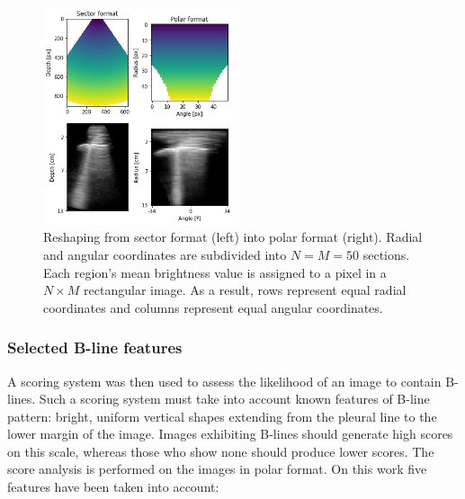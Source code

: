 \documentclass[12pt]{article} %
\begin{document}
	
	\begin{figure}
	\centering
	\includegraphics[width=0.5\textwidth]{figuras/sector_polar.png}
	\caption{\small Reshaping from sector format (left) into polar format (right). Radial and angular coordinates are subdivided into $N=M=50$ sections. Each region's mean brightness value is assigned to a pixel in a $N\times M$ rectangular image. As a result, rows represent equal radial coordinates and columns represent equal angular coordinates.}
	\label{polar}
	\end{figure}	
	
	
\subsubsection{Selected B-line features}

	A scoring system was then used to assess the likelihood of an image to contain B-lines. Such a scoring system must take into account known features of B-line pattern: bright, uniform vertical shapes extending from the pleural line to the lower margin of the image. Images exhibiting B-lines should generate high scores on this scale, whereas those who show none should produce lower scores. The score analysis is performed on the images in polar format. On this work five features have been taken into account:
	
\end{document}
